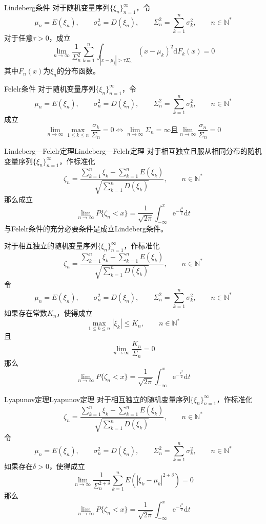 \documentclass[lang = cn, scheme = chinese, thmcnt = section]{elegantbook}
\newcommand{\N}{\mathbb{N}}            %
\newcommand{\dis}{\displaystyle}
\begin{document}
\begin{definition}{Lindeberg条件}
	对于随机变量序列$\{ \xi_n \}_{n=1}^{\infty}$，令%
	$$
	\mu_n=E(\xi_n),\qquad 
	\sigma_n^2=D(\xi_n),\qquad 
	\Sigma_n^2=\sum_{k=1}^{n}\sigma_k^2,\qquad n\in\N^*
	$$
	对于任意$\tau>0$，成立
	$$
	\lim_{n\to\infty}{\frac{1}{\Sigma_n^2}\sum_{k=1}^{n}{\int_{|x-\mu_j|>\tau \Sigma_n}{(x-\mu_k)^2\mathrm{d}F_k(x)}}}=0
	$$
	其中$F_n(x)$为$\xi_n$的分布函数。
\end{definition}

\begin{definition}{Felelr条件}
	对于随机变量序列$\{ \xi_n \}_{n=1}^{\infty}$，令%
	$$
	\mu_n=E(\xi_n),\qquad 
	\sigma_n^2=D(\xi_n),\qquad 
	\Sigma_n^2=\sum_{k=1}^{n}\sigma_k^2,\qquad n\in\N^*
	$$
	成立%
	$$
	\lim_{n\to\infty}\max_{1\le k\le n}\frac{\sigma_k}{\Sigma_n}=0
	\iff \lim_{n\to\infty}{\Sigma_n}=\infty\text{且}\lim_{n\to\infty}\frac{\sigma_n}{\Sigma_n}=0
	$$
\end{definition}

\begin{theorem}{Lindeberg—Felelr定理}{Lindeberg—Felelr定理}
	对于相互独立且服从相同分布的随机变量序列$\{ \xi_n \}_{n=1}^{\infty}$，作标准化
	$$
	\zeta_n=\frac{\dis\sum_{k=1}^{n}{\xi_k}-\sum_{k=1}^{n}{E(\xi_k)}}{\dis\sqrt{\sum_{k=1}^{n}{D(\xi_k)}}},\qquad n\in\N^*
	$$
	那么成立
	$$
	\lim_{n\to\infty}{P\{\zeta_n<x\}}=\frac{1}{\sqrt{2\pi}}\int_{-\infty}^{x}{\mathrm{e}^{-\frac{t^2}{2}}\mathrm{d}t}
	$$
	与Felelr条件的充分必要条件是成立Lindeberg条件。
\end{theorem}

\begin{corollary}
	对于相互独立的随机变量序列$\{ \xi_n \}_{n=1}^{\infty}$，作标准化
	$$
	\zeta_n=\frac{\dis\sum_{k=1}^{n}{\xi_k}-\sum_{k=1}^{n}{E(\xi_k)}}{\dis\sqrt{\sum_{k=1}^{n}{D(\xi_k)}}},\qquad n\in\N^*
	$$
	令%
	$$
	\mu_n=E(\xi_n),\qquad 
	\sigma_n^2=D(\xi_n),\qquad 
	\Sigma_n^2=\sum_{k=1}^{n}\sigma_k^2,\qquad n\in\N^*
	$$
	如果存在常数$K_n$，使得成立
	$$
	\max_{1\le k\le n}{|\xi_k|}\le K_n,\qquad n\in\N^*
	$$
	且
	$$
	\lim_{n\to\infty}{\frac{K_n}{\Sigma_n}}=0
	$$
	那么
	$$
	\lim_{n\to\infty}{P\{\zeta_n<x\}}=\frac{1}{\sqrt{2\pi}}\int_{-\infty}^{x}{\mathrm{e}^{-\frac{t^2}{2}}\mathrm{d}t}
	$$
\end{corollary}

\begin{corollary}{Lyapunov定理}{Lyapunov定理}
	对于相互独立的随机变量序列$\{ \xi_n \}_{n=1}^{\infty}$，作标准化
	$$
	\zeta_n=\frac{\dis\sum_{k=1}^{n}{\xi_k}-\sum_{k=1}^{n}{E(\xi_k)}}{\dis\sqrt{\sum_{k=1}^{n}{D(\xi_k)}}},\qquad n\in\N^*
	$$
	令%
	$$
	\mu_n=E(\xi_n),\qquad 
	\sigma_n^2=D(\xi_n),\qquad 
	\Sigma_n^2=\sum_{k=1}^{n}\sigma_k^2,\qquad n\in\N^*
	$$
	如果存在$\delta>0$，使得成立
	$$
	\lim_{n\to\infty}\frac{1}{\Sigma_n^{2+\delta}}\sum_{k=1}^{n}{E(|\xi_k-\mu_k|^{2+\delta})}=0
	$$
	那么
	$$
	\lim_{n\to\infty}{P\{\zeta_n<x\}}=\frac{1}{\sqrt{2\pi}}\int_{-\infty}^{x}{\mathrm{e}^{-\frac{t^2}{2}}\mathrm{d}t}
	$$
\end{corollary}
\end{document}
